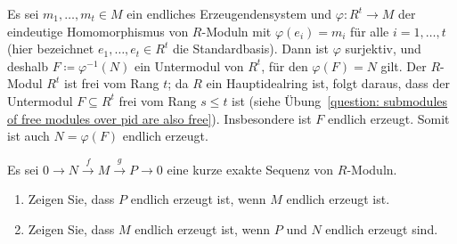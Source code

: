 \begin{solution}
  Es sei $m_1, \dotsc, m_t \in M$ ein endliches Erzeugendensystem und $\varphi \colon R^t \to M$ der eindeutige Homomorphismus von $R$-Moduln mit $\varphi(e_i) = m_i$ für alle $i = 1, \dotsc, t$ (hier bezeichnet $e_1, \dotsc, e_t \in R^t$ die Standardbasis).
  Dann ist $\varphi$ surjektiv, und deshalb $F \coloneqq \varphi^{-1}(N)$ ein Untermodul von $R^t$, für den $\varphi(F) = N$ gilt.
  Der $R$-Modul $R^t$ ist frei vom Rang $t$; da $R$ ein Hauptidealring ist, folgt daraus, dass der Untermodul $F \subseteq R^t$ frei vom Rang $s \leq t$ ist (siehe Übung~\ref{question: submodules of free modules over pid are also free}).
  Insbesondere ist $F$ endlich erzeugt.
  Somit ist auch $N = \varphi(F)$ endlich erzeugt.
\end{solution}


\begin{question}
  \label{question: finitely generated in short exact sequences}
  Es sei $0 \to N \xrightarrow{f} M \xrightarrow{g} P \to 0$ eine kurze exakte Sequenz von $R$-Moduln.
  \begin{enumerate}
    \item
      Zeigen Sie, dass $P$ endlich erzeugt ist, wenn $M$ endlich erzeugt ist.
    \item
      Zeigen Sie, dass $M$ endlich erzeugt ist, wenn $P$ und $N$ endlich erzeugt sind.
  \end{enumerate}
\end{question}


